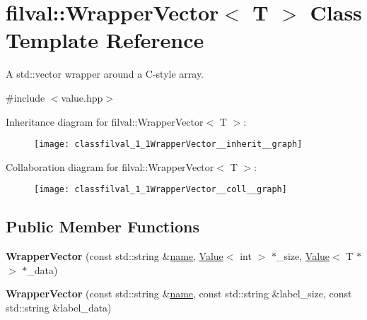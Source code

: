 \hypertarget{classfilval_1_1WrapperVector}{}\section{filval\+:\+:Wrapper\+Vector$<$ T $>$ Class Template Reference}
\label{classfilval_1_1WrapperVector}


A std\+::vector wrapper around a C-\/style array.  




{\ttfamily \#include $<$value.\+hpp$>$}



Inheritance diagram for filval\+:\+:Wrapper\+Vector$<$ T $>$\+:
\nopagebreak
\begin{figure}[H]
\begin{center}
\leavevmode
\texttt{[image: classfilval\_1\_1WrapperVector\_\_inherit\_\_graph]}
\end{center}
\end{figure}


Collaboration diagram for filval\+:\+:Wrapper\+Vector$<$ T $>$\+:
\nopagebreak
\begin{figure}[H]
\begin{center}
\leavevmode
\texttt{[image: classfilval\_1\_1WrapperVector\_\_coll\_\_graph]}
\end{center}
\end{figure}
\subsection*{Public Member Functions}
\begin{DoxyCompactItemize}
\item 
\hypertarget{classfilval_1_1WrapperVector_acb4da90ced874b611dad874e5df6ea7b}{}\label{classfilval_1_1WrapperVector_acb4da90ced874b611dad874e5df6ea7b} 
{\bfseries Wrapper\+Vector} (const std\+::string \&\hyperlink{classfilval_1_1GenValue_a007e38c03ee041c2a657afa3d6e91ab1}{name}, \hyperlink{classfilval_1_1Value}{Value}$<$ int $>$ $\ast$\+\_\+size, \hyperlink{classfilval_1_1Value}{Value}$<$ T $\ast$$>$ $\ast$\+\_\+data)
\item 
\hypertarget{classfilval_1_1WrapperVector_a26dc4ed6f00b772fcc1d65379de3f3da}{}\label{classfilval_1_1WrapperVector_a26dc4ed6f00b772fcc1d65379de3f3da} 
{\bfseries Wrapper\+Vector} (const std\+::string \&\hyperlink{classfilval_1_1GenValue_a007e38c03ee041c2a657afa3d6e91ab1}{name}, const std\+::string \&label\+\_\+size, const std\+::string \&label\+\_\+data)
\end{DoxyCompactItemize}
